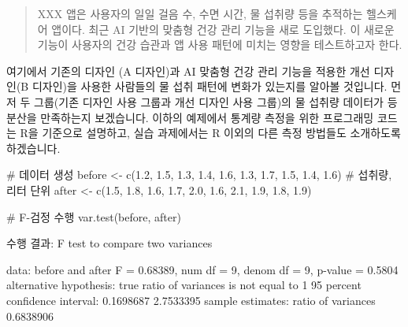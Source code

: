 \documentclass[
  letterpaper,
]{book}
\newenvironment{Shaded}{\begin{snugshade}}{\end{snugshade}}
\newcommand{\CommentTok}[1]{\textcolor[rgb]{0.37,0.37,0.37}{#1}}
\newcommand{\DecValTok}[1]{\textcolor[rgb]{0.68,0.00,0.00}{#1}}
\newcommand{\FloatTok}[1]{\textcolor[rgb]{0.68,0.00,0.00}{#1}}
\newcommand{\FunctionTok}[1]{\textcolor[rgb]{0.28,0.35,0.67}{#1}}
\newcommand{\NormalTok}[1]{\textcolor[rgb]{0.00,0.23,0.31}{#1}}
\newcommand{\OtherTok}[1]{\textcolor[rgb]{0.00,0.23,0.31}{#1}}
\newcommand{\SpecialCharTok}[1]{\textcolor[rgb]{0.37,0.37,0.37}{#1}}
\renewenvironment{Shaded}
    {\begin{snugshade}
    \begin{singlespace}
    \linespread{1}
    }
    {\end{singlespace}
    \end{snugshade}
}
\begin{document}
\begin{quote}
XXX 앱은 사용자의 일일 걸음 수, 수면 시간, 물 섭취량 등을 추적하는
헬스케어 앱이다. 최근 AI 기반의 맞춤형 건강 관리 기능을 새로 도입했다.
이 새로운 기능이 사용자의 건강 습관과 앱 사용 패턴에 미치는 영향을
테스트하고자 한다.
\end{quote}

여기에서 기존의 디자인 (A 디자인)과 AI 맞춤형 건강 관리 기능을 적용한
개선 디자인(B 디자인)을 사용한 사람들의 물 섭취 패턴에 변화가 있는지를
알아볼 것입니다. 먼저 두 그룹(기존 디자인 사용 그룹과 개선 디자인 사용
그룹)의 물 섭취량 데이터가 등분산을 만족하는지 보겠습니다. 이하의
예제에서 통계량 측정을 위한 프로그래밍 코드는 R을 기준으로 설명하고,
실습 과제에서는 R 이외의 다른 측정 방법들도 소개하도록 하겠습니다.

\begin{Shaded}
\begin{Highlighting}[]
\CommentTok{\# 데이터 생성}
\NormalTok{before }\OtherTok{\textless{}{-}} \FunctionTok{c}\NormalTok{(}\FloatTok{1.2}\NormalTok{, }\FloatTok{1.5}\NormalTok{, }\FloatTok{1.3}\NormalTok{, }\FloatTok{1.4}\NormalTok{, }\FloatTok{1.6}\NormalTok{, }\FloatTok{1.3}\NormalTok{, }\FloatTok{1.7}\NormalTok{, }\FloatTok{1.5}\NormalTok{, }\FloatTok{1.4}\NormalTok{, }\FloatTok{1.6}\NormalTok{)  }\CommentTok{\# 섭취량, 리터 단위}
\NormalTok{after }\OtherTok{\textless{}{-}} \FunctionTok{c}\NormalTok{(}\FloatTok{1.5}\NormalTok{, }\FloatTok{1.8}\NormalTok{, }\FloatTok{1.6}\NormalTok{, }\FloatTok{1.7}\NormalTok{, }\FloatTok{2.0}\NormalTok{, }\FloatTok{1.6}\NormalTok{, }\FloatTok{2.1}\NormalTok{, }\FloatTok{1.9}\NormalTok{, }\FloatTok{1.8}\NormalTok{, }\FloatTok{1.9}\NormalTok{)}

\CommentTok{\# F{-}검정 수행}
\FunctionTok{var.test}\NormalTok{(before, after)}
\end{Highlighting}
\end{Shaded}

\begin{Shaded}
\begin{Highlighting}[]
\NormalTok{수행 결과}\SpecialCharTok{:}
\NormalTok{F test to compare two variances}

\NormalTok{data}\SpecialCharTok{:}\NormalTok{  before and after}
\NormalTok{F }\OtherTok{=} \FloatTok{0.68389}\NormalTok{, num df }\OtherTok{=} \DecValTok{9}\NormalTok{, denom df }\OtherTok{=} \DecValTok{9}\NormalTok{, p}\SpecialCharTok{{-}}\NormalTok{value }\OtherTok{=} \FloatTok{0.5804}
\NormalTok{alternative hypothesis}\SpecialCharTok{:}\NormalTok{ true ratio of variances is not equal to }\DecValTok{1}
\DecValTok{95}\NormalTok{ percent confidence interval}\SpecialCharTok{:}
 \FloatTok{0.1698687} \FloatTok{2.7533395}
\NormalTok{sample estimates}\SpecialCharTok{:}
\NormalTok{ratio of variances }
         \FloatTok{0.6838906} 
\end{Highlighting}
\end{Shaded}
\end{document}
